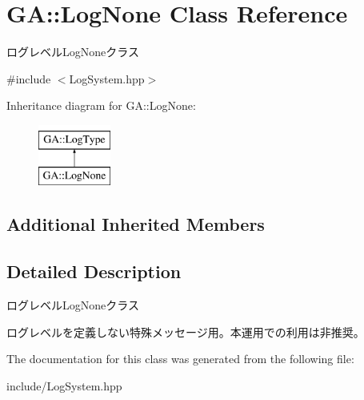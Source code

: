 \hypertarget{class_g_a_1_1_log_none}{}\section{GA\+::Log\+None Class Reference}
\label{class_g_a_1_1_log_none}


ログレベル\+Log\+Noneクラス  




{\ttfamily \#include $<$Log\+System.\+hpp$>$}

Inheritance diagram for GA\+::Log\+None\+:\begin{figure}[H]
\begin{center}
\leavevmode
\includegraphics[height=2.000000cm]{class_g_a_1_1_log_none}
\end{center}
\end{figure}
\subsection*{Additional Inherited Members}


\subsection{Detailed Description}
ログレベル\+Log\+Noneクラス 

ログレベルを定義しない特殊メッセージ用。本運用での利用は非推奨。 

The documentation for this class was generated from the following file\+:\begin{DoxyCompactItemize}
\item 
include/Log\+System.\+hpp\end{DoxyCompactItemize}
